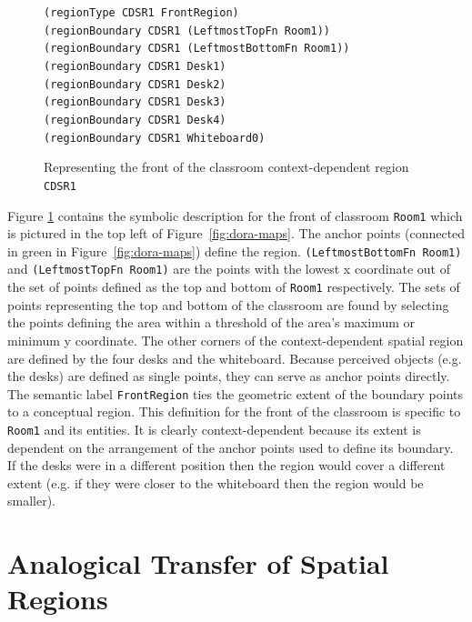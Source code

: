 \documentclass[letterpaper]{article}
\newcommand{\fw}[1]{\texttt{#1}}
\begin{document}
\begin{figure}[h]
	{\fontsize{8}{8} %
  
\fw{(regionType CDSR1 FrontRegion)\\
(regionBoundary CDSR1 (LeftmostTopFn Room1))\\
(regionBoundary CDSR1 (LeftmostBottomFn Room1))\\
(regionBoundary CDSR1 Desk1)\\
(regionBoundary CDSR1 Desk2)\\
(regionBoundary CDSR1 Desk3)\\
(regionBoundary CDSR1 Desk4)\\
(regionBoundary CDSR1 Whiteboard0)\\
}}
  \caption{Representing the front of the classroom context-dependent region \fw{CDSR1}}
  \label{fig:cdsr-reps}
\end{figure}

Figure \ref{fig:cdsr-reps} contains the symbolic description for the front of classroom \fw{Room1} which is pictured in the top left of Figure~\ref{fig:dora-maps}. The anchor points (connected in green in Figure~\ref{fig:dora-maps}) define the region. \fw{(LeftmostBottomFn Room1)} and \fw{(LeftmostTopFn Room1)} are the points with the lowest x coordinate out of the set of points defined as the top and bottom of \fw{Room1} respectively. The sets of points representing the top and bottom of the classroom are found by selecting the points defining the area within a threshold of the area's maximum or minimum y coordinate. The other corners of the context-dependent spatial region are defined by the four desks and the whiteboard. Because perceived objects (e.g. the desks) are defined as single points, they can serve as anchor points directly. The semantic label \fw{FrontRegion} ties the geometric extent of the boundary points to a conceptual region. This definition for the front of the classroom is specific to \fw{Room1} and its entities. It is clearly context-dependent because its extent is dependent on the arrangement of the anchor points used to define its boundary. If the desks were in a different position then the region would cover a different extent (e.g. if they were closer to the whiteboard then the region would be smaller). 



\section{Analogical Transfer of Spatial Regions}\label{sec:analogy}
\end{document}
